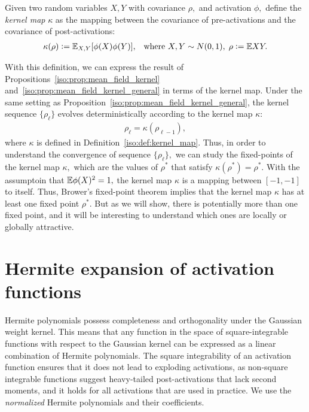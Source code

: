 \begin{definition}
    \label{iso:def:kernel_map}
Given two random variables $X, Y$ with covariance $\rho,$ and activation $\phi,$ define the \emph{kernel map } $\kappa$ as the mapping between the covariance of pre-activations and the covariance of post-activations:
\begin{align}\label{iso:eq:kernel_map}
    \kappa(\rho):=\mathbb{E}_{X,Y}[ \phi(X)\phi(Y)], && \text{where } X, Y\sim N(0,1),\; \rho:=\mathbb{E} XY.
\end{align}
\end{definition}

With this definition, we can express the result of Propositions~\ref{iso:prop:mean_field_kernel} and~\ref{iso:prop:mean_field_kernel_general} in terms of the kernel map. Under the same setting as Proposition~\ref{iso:prop:mean_field_kernel_general}, the kernel sequence $\{\rho_\ell\}$ evolves deterministically according to the kernel map $\kappa$:
\begin{align}
    \rho_{\ell} = \kappa(\rho_{\ell-1}),
\end{align}
where $\kappa$ is defined in Definition~\ref{iso:def:kernel_map}.  Thus, in order to understand the convergence of sequence $\{\rho_\ell\},$ we can study the fixed-points of the kernel map $\kappa,$
which are the values of $\rho^*$ that satisfy $\kappa(\rho^*) = \rho^*.$ With the assumptoin that $\mathbb{E} \phi(X)^2=1,$ the kernel map $\kappa$ is a mapping between $[-1,-1]$ to itself. Thus, Brower's fixed-point theorem implies that the kernel map $\kappa$ has at least one fixed point $\rho^*.$ But as we will show, there is potentially more than one fixed point, and it will be interesting to understand which ones are locally or globally attractive. 


\section{Hermite expansion of activation functions}
Hermite polynomials possess completeness and orthogonality under the Gaussian weight kernel. This means that any function in the space of square-integrable functions with respect to the Gaussian kernel can be expressed as a linear combination of Hermite polynomials. The square integrability of an activation function ensures that it does not lead to exploding activations, as non-square integrable functions suggest heavy-tailed post-activations that lack second moments, and it holds for all activations that are used in practice. We use the \emph{normalized} Hermite polynomials and their coefficients. 

